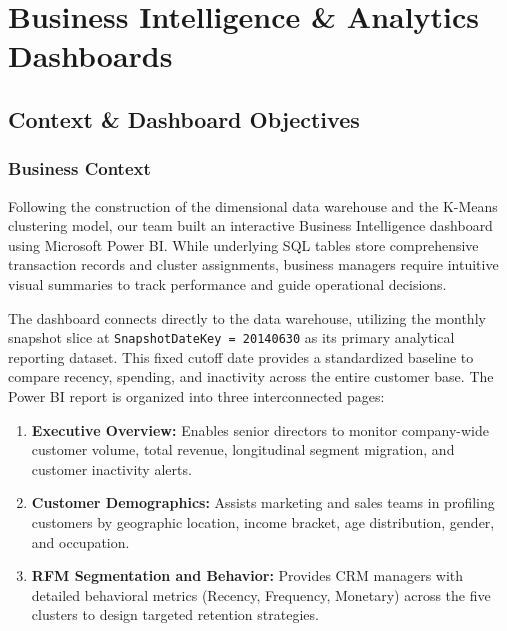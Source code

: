 \chapter{Business Intelligence \& Analytics Dashboards}
\label{chap:power_bi}

\section{Context \& Dashboard Objectives}
\label{sec:bi_context}

\subsection{Business Context}
\label{subsec:bi_business_context}
Following the construction of the dimensional data warehouse and the K-Means clustering model, our team built an interactive Business Intelligence dashboard using Microsoft Power BI. While underlying SQL tables store comprehensive transaction records and cluster assignments, business managers require intuitive visual summaries to track performance and guide operational decisions.

The dashboard connects directly to the data warehouse, utilizing the monthly snapshot slice at \texttt{SnapshotDateKey = 20140630} as its primary analytical reporting dataset. This fixed cutoff date provides a standardized baseline to compare recency, spending, and inactivity across the entire customer base. The Power BI report is organized into three interconnected pages:
\begin{enumerate}
    \item \textbf{Executive Overview:} Enables senior directors to monitor company-wide customer volume, total revenue, longitudinal segment migration, and customer inactivity alerts.
    \item \textbf{Customer Demographics:} Assists marketing and sales teams in profiling customers by geographic location, income bracket, age distribution, gender, and occupation.
    \item \textbf{RFM Segmentation and Behavior:} Provides CRM managers with detailed behavioral metrics (Recency, Frequency, Monetary) across the five clusters to design targeted retention strategies.
\end{enumerate}

